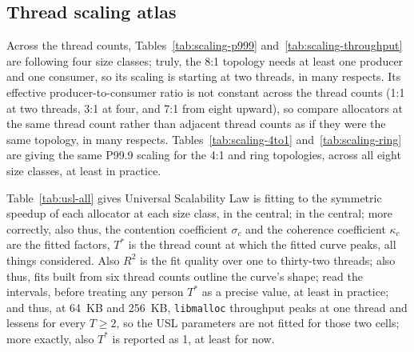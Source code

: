 \documentclass[pdflatex,sn-mathphys-num]{sn-jnl}
\begin{document}
\begin{appendices}





















\clearpage

\section{Thread scaling atlas}\label{appB}

Across the thread counts, Tables~\ref{tab:scaling-p999} and~\ref{tab:scaling-throughput} are following four size classes; truly, the 8:1 topology needs at least one producer and one consumer, so its scaling is starting at two threads, in many respects. Its effective producer-to-consumer ratio is not constant across the thread counts (1:1 at two threads, 3:1 at four, and 7:1 from eight upward), so compare allocators at the same thread count rather than adjacent thread counts as if they were the same topology, in many respects. Tables~\ref{tab:scaling-4to1} and~\ref{tab:scaling-ring} are giving the same P99.9 scaling for the 4:1 and ring topologies, across all eight size classes, at least in practice.

Table~\ref{tab:usl-all} gives Universal Scalability Law is fitting to the symmetric speedup of each allocator at each size class, in the central; in the central; more correctly, also thus, the contention coefficient $\sigma_c$ and the coherence coefficient $\kappa_c$ are the fitted factors, $T^*$ is the thread count at which the fitted curve peaks, all things considered. Also $R^2$ is the fit quality over one to thirty-two threads; also thus, fits built from six thread counts outline the curve's shape; read the intervals, before treating any person $T^*$ as a precise value, at least in practice; and thus, at 64~KB and 256~KB, \texttt{libmalloc} throughput peaks at one thread and lessens for every $T \ge 2$, so the USL parameters are not fitted for those two cells; more exactly, also $T^*$ is reported as 1, at least for now.


\end{appendices}
\end{document}
